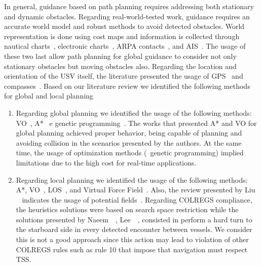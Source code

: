     
    
    In general, guidance based on path planning requires addressing both stationary and dynamic obstacles. Regarding real-world-tested work, guidance requires an accurate world model and robust methods to avoid detected obstacles. World representation is done using cost maps and information is collected through nautical charts~\cite{Larson2006Autonomous}, electronic charts~\cite{Naus2013Idea}, \ac{ARPA} contacts~\cite{Larson2006Autonomous}, and \ac{AIS}~\cite{Abdelaal2017NMPC}. The usage of these two last allow path planning for global guidance to consider not only stationary obstacles but moving obstacles also. Regarding the location and orientation of the \ac{USV} itself, the literature presented the usage of GPS~\cite{Benjamin2004COLREGS} and compasses~\cite{Annamalai2013Comparison}. Based on our literature review we identified the following methods for global and local planning
    
    \begin{enumerate}
    
        \item Regarding global planning we identified the usage of the following methods: \ac{VO}~\cite{Larson2006Autonomous, Kuwata2014Safe, Zhuang2011Motion, Huang2019Generalized}, A*~\cite{Naeem2012COLREGS, Campbell2012Review_COLREGs, Naus2013Idea} e genetic programming~\cite{Svec2012Automated, Svec2011aAutomated}. The works that presented A* and VO for global planning achieved proper behavior, being capable of planning and avoiding collision in the scenarios presented by the authors. At the same time, the usage of optimization methods (\ie~genetic programming) implied limitations due to the high cost for real-time applications. 
        
        \item Regarding local planning we identified the usage of the following methods: A*\cite{Larson2006Autonomous, Campbell2013Automatic, Agrawal2015COLREGS}, \ac{VO}~\cite{Larson2006Autonomous, Huang2019Generalized}, \ac{LOS}~\cite{Naeem2012COLREGS}, and Virtual Force Field~\cite{Lee2004Fuzzy}. Also, the review presented by Liu \etal~\cite{Liu2016Unmanned} indicates the usage of potential fields~\cite{Healey2007Collaborative, Soltan2009Trajectory}. Regarding \ac{COLREGS} compliance, the heuristics solutions were based on search space restriction while the solutions presented by  Naeem~\etal~\cite{Naeem2012COLREGS}, Lee~\etal~\cite{Lee2004Fuzzy}, consisted in perform a hard turn to the starboard side in every detected encounter between vessels. We consider this is not a good approach since this action may lead to violation of other \ac{COLREGS} rules such as rule 10 that impose that navigation must respect \acf{TSS}.
        
    \end{enumerate}
    

